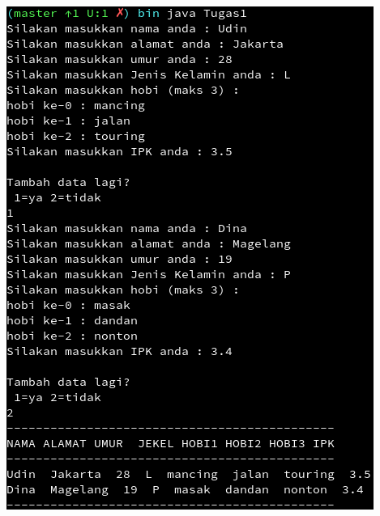 \documentclass[a4paper,12pt]{article}
\begin{document}
\begin{center}
    \includegraphics[scale=.7]{Tugas1.png} 
\end{center}
\end{document}
